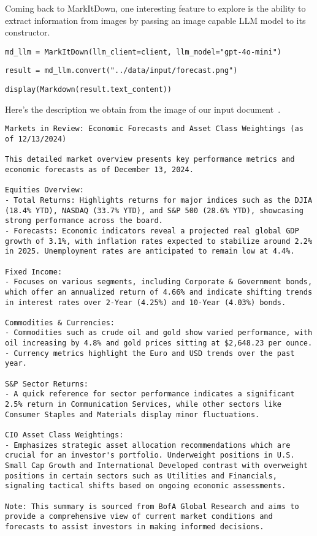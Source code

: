 Coming back to MarkItDown, one interesting feature to explore is the ability to extract information from images by passing an image capable LLM model to its constructor.

\begin{verbatim}
md_llm = MarkItDown(llm_client=client, llm_model="gpt-4o-mini")
\end{verbatim}

\begin{verbatim}
result = md_llm.convert("../data/input/forecast.png")
\end{verbatim}

\begin{verbatim}
display(Markdown(result.text_content))
\end{verbatim}

Here's the description we obtain from the image of our input document~.

\begin{verbatim}
Markets in Review: Economic Forecasts and Asset Class Weightings (as of 12/13/2024)

This detailed market overview presents key performance metrics and economic forecasts as of December 13, 2024.

Equities Overview:
- Total Returns: Highlights returns for major indices such as the DJIA (18.4% YTD), NASDAQ (33.7% YTD), and S&P 500 (28.6% YTD), showcasing strong performance across the board.
- Forecasts: Economic indicators reveal a projected real global GDP growth of 3.1%, with inflation rates expected to stabilize around 2.2% in 2025. Unemployment rates are anticipated to remain low at 4.4%.

Fixed Income:
- Focuses on various segments, including Corporate & Government bonds, which offer an annualized return of 4.66% and indicate shifting trends in interest rates over 2-Year (4.25%) and 10-Year (4.03%) bonds.

Commodities & Currencies:
- Commodities such as crude oil and gold show varied performance, with oil increasing by 4.8% and gold prices sitting at $2,648.23 per ounce.
- Currency metrics highlight the Euro and USD trends over the past year.

S&P Sector Returns:
- A quick reference for sector performance indicates a significant 2.5% return in Communication Services, while other sectors like Consumer Staples and Materials display minor fluctuations.

CIO Asset Class Weightings:
- Emphasizes strategic asset allocation recommendations which are crucial for an investor's portfolio. Underweight positions in U.S. Small Cap Growth and International Developed contrast with overweight positions in certain sectors such as Utilities and Financials, signaling tactical shifts based on ongoing economic assessments.

Note: This summary is sourced from BofA Global Research and aims to provide a comprehensive view of current market conditions and forecasts to assist investors in making informed decisions.
\end{verbatim}

